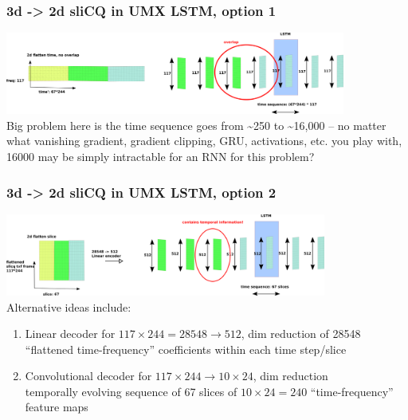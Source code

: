 \documentclass[usenames,dvipsnames]{beamer}
\begin{document}
\begin{frame}
	\frametitle{3d -> 2d sliCQ in UMX LSTM, option 1}
	\includegraphics[height=2.7cm]{./umxslicqlstm1.png}\\
	Big problem here is the time sequence goes from \textasciitilde 250 to \textasciitilde 16,000 -- no matter what vanishing gradient, gradient clipping, GRU, activations, etc. you play with, 16000 may be simply intractable for an RNN for this problem?
\end{frame}

\begin{frame}
	\frametitle{3d -> 2d sliCQ in UMX LSTM, option 2}
	\includegraphics[height=2.7cm]{./umxslicqlstm2.png}\\
	Alternative ideas include:
	\begin{enumerate}
		\item
			Linear decoder for $117 \times 244 = 28548 \rightarrow 512$, dim reduction of 28548 ``flattened time-frequency'' coefficients within each time step/slice
		\item
			Convolutional decoder for $117 \times 244 \rightarrow 10 \times 24$, dim reduction\\
			temporally evolving sequence of 67 slices of $10 \times 24 = 240$ ``time-frequency'' feature maps
	\end{enumerate}
\end{frame}
\end{document}
